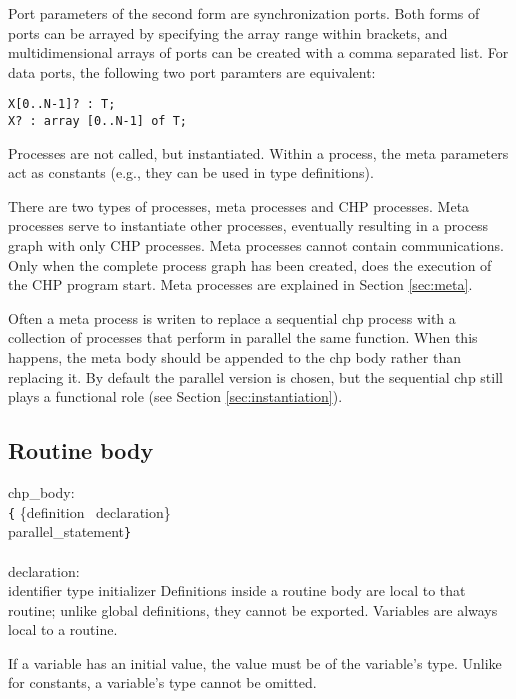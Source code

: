 Port parameters of the second form are synchronization ports. Both forms
of ports can be arrayed by specifying the array range within brackets, and
multidimensional arrays of ports can be created with a comma separated list.
For data ports, the following two port paramters are equivalent:
\begin{verbatim}
X[0..N-1]? : T;
X? : array [0..N-1] of T;
\end{verbatim}

Processes are not called, but instantiated. Within a process,
the meta parameters act as constants (e.g., they can be used in
type definitions).

There are two types of processes, meta processes and CHP processes. Meta
processes serve to instantiate other processes, eventually resulting in
a process graph with only CHP processes. Meta processes cannot contain
communications. Only when the complete process graph has been created,
does the execution of the CHP program start. Meta processes are
explained in Section \ref{sec:meta}.

Often a meta process is writen to replace a sequential chp process with a
collection of processes that perform in parallel the same function.  When this
happens, the meta body should be appended to the chp body rather than replacing
it.  By default the parallel version is chosen, but the sequential chp still
plays a functional role (see Section \ref{sec:instantiation}).


\subsection{Routine body}\label{sec:body}

\grammarstart
chp\_body: \\
       \verb|{| \{definition \orbox \ declaration\}\SERIESOPT \\
      \>\qquad parallel\_statement\TSEQOPT \verb|}| \\
 \\
declaration: \\
       identifier\LIST {\tt{}:} type initializer\OPT {\tt{};}
\grammarend
Definitions inside a routine body are local to that routine; unlike
global definitions, they cannot be exported. Variables are always
local to a routine.

If a variable has an initial value, the value must be of the variable's
type. Unlike for constants, a variable's type cannot be omitted.


